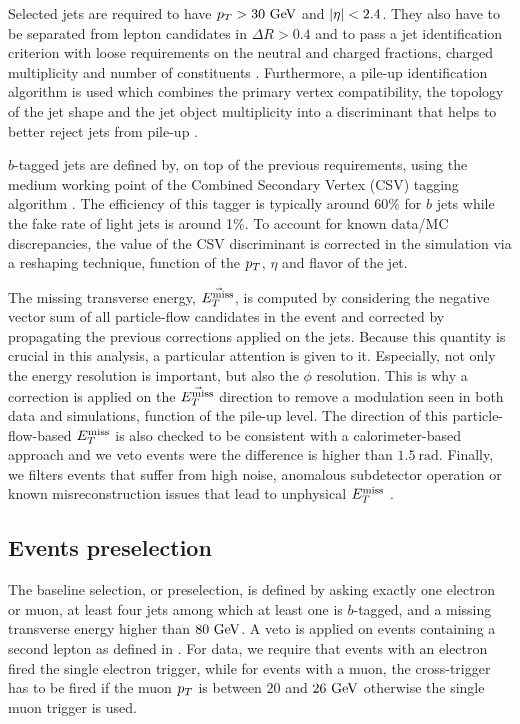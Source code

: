        Selected jets are required to have $p_T > 30 ~\text{GeV}$ and $\left| \eta \right| < 2.4$. They also
       have to be separated from lepton candidates in $\Delta R > 0.4$ and to pass a jet
       identification criterion with loose requirements on the neutral and
       charged fractions, charged multiplicity and number of constituents \cite{JetID}.
       Furthermore, a pile-up identification algorithm is used which combines the primary vertex
       compatibility, the topology of the jet shape and the jet object multiplicity into
       a discriminant that helps to better reject jets from pile-up \cite{PUJetID}.

       $b$-tagged jets are defined by, on top of the previous requirements, using the
       medium working point of the Combined Secondary Vertex (CSV) tagging algorithm \cite{BTagging8TeV}.
       The efficiency of this tagger is typically around 60\% for $b$ jets while the fake
       rate of light jets is around 1\%. To account for known data/MC discrepancies, the
       value of the CSV discriminant is corrected in the simulation via a reshaping technique,
       function of the $p_T$, $\eta$ and flavor of the jet.

       The missing transverse energy, $\vec{E_T^\text{miss}}$, is computed by considering the
       negative vector sum of all particle-flow candidates in the event and corrected by
       propagating the previous corrections applied on the jets. Because this quantity is
       crucial in this analysis, a particular attention is given to it. Especially, not only
       the energy resolution is important, but also the $\phi$ resolution. This is why
       a correction is applied on the $\vec{E_T^\text{miss}}$ direction to remove a modulation seen in
       both data and simulations, function of the pile-up level. The direction of this
       particle-flow-based $E_T^\text{miss}$ is also checked to be consistent with a calorimeter-based
       approach and we veto events were the difference is higher than $1.5~\text{rad}$.
       Finally, we filters events that suffer from high noise, anomalous subdetector operation
       or known misreconstruction issues that lead to unphysical $E_T^\text{miss}$ \cite{METperf}.

        \subsection{Events preselection}

        The baseline selection, or preselection,
        is defined by asking exactly one electron or muon, at least
        four jets among which at least one is $b$-tagged, and a missing transverse energy higher than $80 ~\text{GeV}$.
        A veto is applied on events containing a second lepton as defined in .
        For data, we require that events with an electron fired the single electron
        trigger, while for events with a muon, the cross-trigger has to be fired
        if the muon $p_T$ is between $20$ and $26~\text{GeV}$ otherwise the single muon trigger
        is used.

